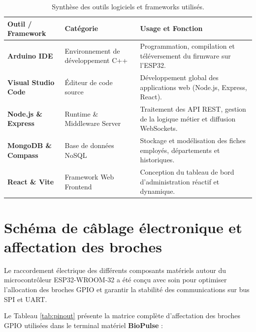 \documentclass[12pt,a4paper]{report}
\begin{document}
\begin{table}[H]
\centering
\small
\caption{Synthèse des outils logiciels et frameworks utilisés.}
\label{tab:logiciel}
\begin{tabular}{|p{4cm}|p{4.5cm}|p{7cm}|}
\hline
\rowcolor{mariemblue!20} \textbf{Outil / Framework} & \textbf{Catégorie} & \textbf{Usage et Fonction} \\ \hline
\textbf{Arduino IDE} & Environnement de développement C++ & Programmation, compilation et téléversement du firmware sur l'ESP32. \\ \hline
\textbf{Visual Studio Code} & Éditeur de code source & Développement global des applications web (Node.js, Express, React). \\ \hline
\textbf{Node.js \& Express} & Runtime \& Middleware Server & Traitement des API REST, gestion de la logique métier et diffusion WebSockets. \\ \hline
\textbf{MongoDB \& Compass} & Base de données NoSQL & Stockage et modélisation des fiches employés, départements et historiques. \\ \hline
\textbf{React \& Vite} & Framework Web Frontend & Conception du tableau de bord d'administration réactif et dynamique. \\ \hline
\end{tabular}
\end{table}

\section{Schéma de câblage électronique et affectation des broches}
Le raccordement électrique des différents composants matériels autour du microcontrôleur ESP32-WROOM-32 a été conçu avec soin pour optimiser l'allocation des broches GPIO et garantir la stabilité des communications sur bus SPI et UART.

Le Tableau \ref{tab:pinout} présente la matrice complète d'affectation des broches GPIO utilisées dans le terminal matériel \textbf{BioPulse} :
\end{document}
